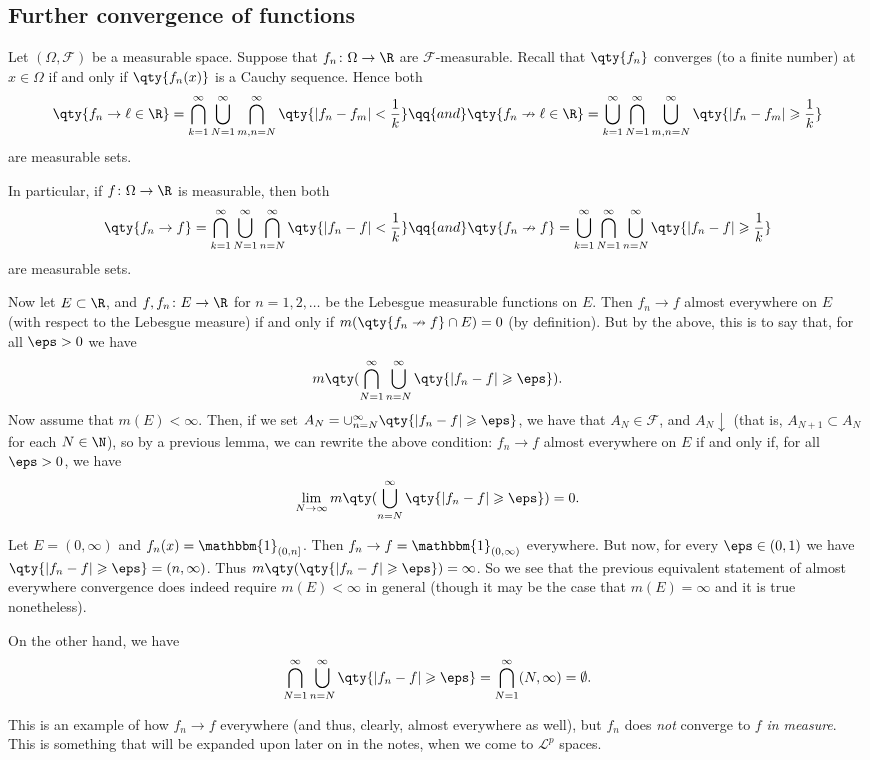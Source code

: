 \documentclass{maths}
\newcommand{\alg}{\mathcal{F}}
\newcommand{\ind}{\mathbbm{1}}
\begin{document}
\subsection{Further convergence of functions}

Let $(\Omega,\alg)$ be a measurable space.
Suppose that $f_n\colon\Omega\to\R$ are $\alg$-measurable.
Recall that $\qty{f_n}$ converges (to a finite number) at $x\in\Omega$ if and only if $\qty{f_n(x)}$ is a Cauchy sequence.
Hence both
\[
    \qty{f_n\to\ell\in\R}=
    \bigcap_{k=1}^{\infty} \bigcup_{N=1}^{\infty} \bigcap_{m,n=N}^{\infty} \qty{|f_n - f_m| < \frac{1}{k}}
    \qq{and}
    \qty{f_n\nrightarrow\ell\in\R}=
    \bigcup_{k=1}^{\infty} \bigcap_{N=1}^{\infty} \bigcup_{m,n=N}^{\infty} \qty{|f_n - f_m| \geqslant \frac{1}{k}}
\]
are measurable sets.

In particular, if $f\colon\Omega\to\R$ is measurable, then both
\[
    \qty{f_n\to f}=
    \bigcap_{k=1}^{\infty} \bigcup_{N=1}^{\infty} \bigcap_{n=N}^{\infty} \qty{|f_n - f| < \frac{1}{k}}
    \qq{and}
    \qty{f_n\nrightarrow f}=
    \bigcup_{k=1}^{\infty} \bigcap_{N=1}^{\infty} \bigcup_{n=N}^{\infty} \qty{|f_n - f| \geqslant \frac{1}{k}}
\]
are measurable sets.

Now let $E\subset\R$, and $f,f_n\colon E\to\R$ for $n = 1,2,\ldots$ be the Lebesgue measurable functions on $E$.
Then $f_n\to f$ almost everywhere on $E$ (with respect to the Lebesgue measure) if and only if $m(\qty{f_n\nrightarrow f}\cap E)=0$ (by definition).
But by the above, this is to say that, for all $\eps>0$ we have
\[
    m\qty(\bigcap_{N=1}^{\infty} \bigcup_{n=N}^{\infty} \qty{|f_n - f| \geqslant\eps}).
\]
Now assume that $m(E)<\infty$.
Then, if we set $A_N = \cup_{n=N}^{\infty} \qty{|f_n - f| \geqslant\eps}$, we have that $A_N\in\alg$, and $A_N\downarrow$ (that is, $A_{N+1}\subset A_N$ for each $N\in\N$), so by a previous lemma, we can rewrite the above condition: $f_n\to f$ almost everywhere on $E$ if and only if, for all $\eps>0$, we have
\[
    \lim_{N\to\infty} m\qty(\bigcup_{n=N}^{\infty} \qty{|f_n - f| \geqslant\eps}) =
    0.
\]

\begin{ex}
    Let $E=(0,\infty)$ and $f_n(x) = \ind_{(0,n]}$.
    Then $f_n\to f = \ind_{(0,\infty)}$ everywhere.
    But now, for every $\eps\in(0,1)$ we have $\qty{|f_n - f|\geqslant\eps} = (n,\infty)$.
    Thus $m\qty(\qty{|f_n - f| \geqslant\eps})=\infty$.
    So we see that the previous equivalent statement of almost everywhere convergence does indeed require $m(E)<\infty$ in general (though it may be the case that $m(E)=\infty$ and it is true nonetheless).

    On the other hand, we have
    \[
        \bigcap_{N=1}^{\infty} \bigcup_{n=N}^{\infty} \qty{|f_n -f|\geqslant\eps} =
        \bigcap_{N=1}^{\infty} (N,\infty) =
        \emptyset.
    \]

    This is an example of how $f_n\to f$ everywhere (and thus, clearly, almost everywhere as well), but $f_n$ does \emph{not} converge to $f$ \emph{in measure}.
    This is something that will be expanded upon later on in the notes, when we come to $\mathcal{L}^p$ spaces.
\end{ex}
\end{document}
